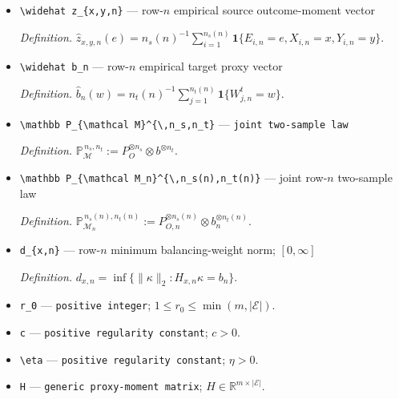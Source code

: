 \documentclass{article}
\begin{document}
\begin{itemize}
  \item \texttt{\textbackslash{}\allowbreak{}widehat z\_\allowbreak{}\{x,\allowbreak{}y,\allowbreak{}n\}\allowbreak{}} --- row-\(n\) empirical source outcome-moment vector
  \par\smallskip\noindent\emph{Definition.} \(\widehat z_{x,y,n}(e)=n_s(n)^{-1}\sum_{i=1}^{n_s(n)}\mathbf 1\{E_{i,n}=e,X_{i,n}=x,Y_{i,n}=y\}\).
  \item \texttt{\textbackslash{}\allowbreak{}widehat b\_\allowbreak{}n} --- row-\(n\) empirical target proxy vector
  \par\smallskip\noindent\emph{Definition.} \(\widehat b_n(w)=n_t(n)^{-1}\sum_{j=1}^{n_t(n)}\mathbf 1\{W^t_{j,n}=w\}\).
  \item \texttt{\textbackslash{}\allowbreak{}mathbb P\_\allowbreak{}\{\textbackslash{}\allowbreak{}mathcal M\}\allowbreak{}\textasciicircum{}\{\textbackslash{}\allowbreak{},\allowbreak{}n\_\allowbreak{}s,\allowbreak{}n\_\allowbreak{}t\}\allowbreak{}} --- \texttt{joint two-\allowbreak{}sample law}
  \par\smallskip\noindent\emph{Definition.} \(\mathbb P_{\mathcal M}^{\,n_s,n_t}:=P_O^{\otimes n_s}\otimes b^{\otimes n_t}\).
  \item \texttt{\textbackslash{}\allowbreak{}mathbb P\_\allowbreak{}\{\textbackslash{}\allowbreak{}mathcal M\_\allowbreak{}n\}\allowbreak{}\textasciicircum{}\{\textbackslash{}\allowbreak{},\allowbreak{}n\_\allowbreak{}s(n),\allowbreak{}n\_\allowbreak{}t(n)\}\allowbreak{}} --- joint row-\(n\) two-sample law
  \par\smallskip\noindent\emph{Definition.} \(\mathbb P_{\mathcal M_n}^{\,n_s(n),n_t(n)}:=P_{O,n}^{\otimes n_s(n)}\otimes b_n^{\otimes n_t(n)}\).
  \item \texttt{d\_\allowbreak{}\{x,\allowbreak{}n\}\allowbreak{}} --- row-\(n\) minimum balancing-weight norm; \([0,\infty]\)
  \par\smallskip\noindent\emph{Definition.} \(d_{x,n}=\inf\{\lVert\kappa\rVert_2:H_{x,n}\kappa=b_n\}\).
  \item \texttt{r\_\allowbreak{}0} --- \texttt{positive integer}; \(1\le r_0\le\min(m,\lvert\mathcal E\rvert)\).
  \item \texttt{c} --- \texttt{positive regularity constant}; \(c>0\).
  \item \texttt{\textbackslash{}\allowbreak{}eta} --- \texttt{positive regularity constant}; \(\eta>0\).
  \item \texttt{H} --- \texttt{generic proxy-\allowbreak{}moment matrix}; \(H\in\mathbb R^{m\times\lvert\mathcal E\rvert}\).

\end{itemize}
\end{document}
